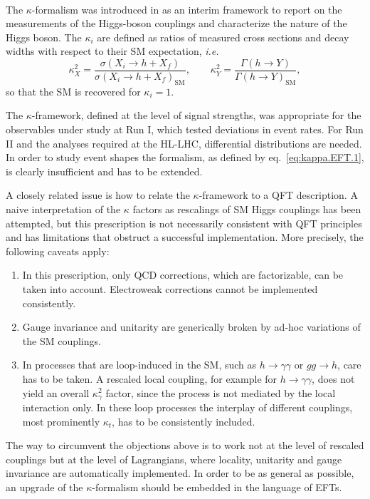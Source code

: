 \\
The $\kappa$-formalism was introduced in\cite{LHCHiggsCrossSectionWorkingGroup:2012nn,Heinemeyer:2013tqa} as an interim framework to report on the measurements of the Higgs-boson couplings and characterize the nature of the Higgs boson. The $\kappa_{i}$ are defined as ratios of measured cross sections and decay widths with respect to their SM expectation, {\it i.e.}
\begin{equation}
  \label{eq:kappa.EFT.1}
  \kappa^{2}_{X} = \frac{\sigma(X_i\rightarrow h+X_f)}{\sigma(X_i\rightarrow h+X_f)_{\text{SM}}}, \qquad \kappa^{2}_{Y} = \frac{\Gamma(h\rightarrow Y)}{\Gamma(h\rightarrow Y)_{\text{SM}}},
\end{equation}
so that the SM is recovered for $\kappa_i=1$.

The $\kappa$-framework, defined at the level of signal strengths, was appropriate for the observables under study at Run I, which tested deviations in event rates. For Run II and the analyses required at the HL-LHC, differential distributions are needed. In order to study event shapes the formalism, as defined by eq.~\eqref{eq:kappa.EFT.1}, is clearly insufficient and has to be extended.

A closely related issue is how to relate the $\kappa$-framework to a QFT description. A naive interpretation of the $\kappa$ factors as rescalings of SM Higgs couplings has been attempted, but this prescription is not necessarily consistent with QFT principles and has limitations that obstruct a successful implementation. More precisely, the following caveats apply:
\begin{enumerate}
\item In this prescription, only QCD corrections, which are factorizable, can be taken into account. Electroweak corrections cannot be implemented consistently.
\item Gauge invariance and unitarity are generically broken by ad-hoc variations of the SM couplings.
\item  In processes that are loop-induced in the SM, such as $h\to \gamma\gamma$ or $gg\to h$, care has to be taken. A rescaled local coupling, for example for $h\to \gamma\gamma$, does not yield an overall $\kappa_{\gamma}^2$ factor, since the process is not mediated by the local interaction only. In these loop processes the interplay of different couplings, most prominently $\kappa_t$, has to be consistently included.        
\end{enumerate}
The way to circumvent the objections above is to work not at the level of rescaled couplings but at the level of Lagrangians, where locality, unitarity and gauge invariance are automatically implemented. In order to be as general as possible, an upgrade of the $\kappa$-formalism should be embedded in the language of EFTs.

